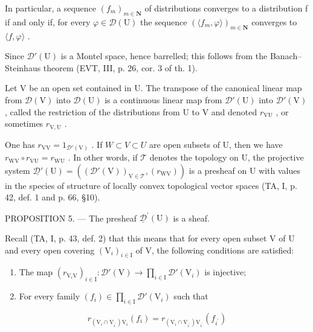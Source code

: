 In particular, a sequence \((f_{m})_{m\in\mathbf{N}}\) of distributions converges to a distribution f if and only if, for every \(\varphi\in\mathcal{D}(\mathrm{U})\) the sequence \((\langle f_{m},\varphi\rangle)_{m\in\mathbf{N}}\) converges to \(\langle f,\varphi\rangle\) .

Since \(\mathcal{D}'(\mathrm{U})\) is a Montel space, hence barrelled; this follows from the Banach–Steinhaus theorem (EVT, III, p. 26, cor. 3 of th. 1).

Let V be an open set contained in U. The transpose of the canonical linear map from \(\mathcal{D}(\mathrm{V})\) into \(\mathcal{D}(\mathrm{U})\) is a continuous linear map from \(\mathcal{D}'(\mathrm{U})\) into \(\mathcal{D}'(\mathrm{V})\) , called the restriction of the distributions from U to V and denoted \(r_{\mathrm{VU}}\) , or sometimes \(r_{\mathrm{V,U}}\) .

One has \(r_{\mathrm{VV}} = 1_{\mathcal{D}'(\mathrm{V})}\) . If \(W \subset V \subset U\) are open subsets of U, then we have \(r_{\mathrm{WV}} \circ r_{\mathrm{VU}} = r_{\mathrm{WU}}\) . In other words, if \(\mathcal{T}\) denotes the topology on U, the projective system \(\underline{\mathcal{D}'}(\mathrm{U}) = ((\mathcal{D}'(\mathrm{V}))_{\mathrm{V} \in \mathcal{T}}, (r_{\mathrm{WV}}))\) is a presheaf on U with values in the species of structure of locally convex topological vector spaces (TA, I, p. 42, def. 1 and p. 66, §10).

PROPOSITION 5. --- The presheaf \(\underline{\mathcal{D}}^{\prime}(\mathrm{U})\) is a sheaf.

Recall (TA, I, p. 43, def. 2) that this means that for every open subset V of U and every open covering \((\mathrm{V}_{i})_{i\in\mathrm{I}}\) of V, the following conditions are satisfied:

\begin{enumerate}
\def\labelenumi{(\roman{enumi})}
\item
  The map \((r_{\mathrm{V}_i\mathrm{V}})_{i\in \mathrm{I}}\colon \mathcal{D}'(\mathrm{V})\to \prod_{i\in \mathrm{I}}\mathcal{D}'(\mathrm{V}_i)\) is injective;
\item
  For every family \((f_i)\in \prod_{i\in \mathrm{I}}\mathcal{D}'(\mathrm{V}_i)\) such that
\end{enumerate}

\[
r _ {(\mathrm{V} _ {i} \cap \mathrm{V} _ {i ^ {\prime}}) \mathrm{V} _ {i}} (f _ {i}) = r _ {(\mathrm{V} _ {i} \cap \mathrm{V} _ {i ^ {\prime}}) \mathrm{V} _ {i ^ {\prime}}} (f _ {i ^ {\prime}})
\]

